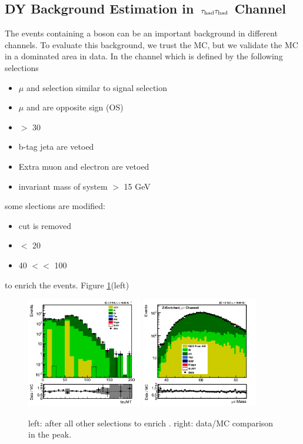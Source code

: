 \subsection{\texorpdfstring{DY Background Estimation in $\,\tau_{\rm had}\tau_{\rm had}$ Channel}{DY Background Estimation in tau-tau Channel}}
The events containing a \Z boson can be an important background in different channels. To evaluate this background, we trust 
the MC, but we validate the MC in a \Z dominated area in data. In the \muTau channel which is defined by the following selections 
\begin{itemize}
\item $\mu$ and \Tau selection similar to signal selection
\item $\mu$ and \Tau are opposite sign (OS)
\item \MET $>$ 30 
\item b-tag jeta are vetoed
\item Extra muon and electron are vetoed 
\item invariant mass of \muTau system $>$ 15 GeV
\end{itemize}
some slections are modified:
\begin{itemize}
\item \mindphifour cut is removed
\item \mttwo $<$ 20 \GeV
\item 40 $<$\tauMT $<$ 100 \GeV
\end{itemize}
to enrich the \Z events. Figure \ref{fig:ZValidation}(left)
\begin{figure}[h]
\centering
\includegraphics[width=0.45\textwidth,keepaspectratio=true]{ZValidation/tauMT_ZValidation.png}
\includegraphics[width=0.45\textwidth,keepaspectratio=true]{ZValidation/InvMass_ZValidation.png}
\caption{left: \tauMT after all other selections to enrich \Z. right: data/MC comparison in the \Z peak.}
\label{fig:ZValidation}
\end{figure}
